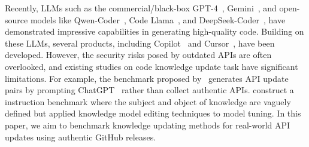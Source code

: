  Recently, LLMs such as the commercial/black-box GPT-4~\cite{openai2024gpt4}, Gemini~\cite{geminiteam2024geminifamilyhighlycapable}, and open-source models like Qwen-Coder~\cite{hui2024qwen2.5coder}, Code Llama~\cite{Roziere2023codellama}, and DeepSeek-Coder~\cite{guo2024deepseek}, have demonstrated impressive capabilities in generating high-quality code. 
Building on these LLMs, several products, including Copilot~\cite{GitHub2022copilot} and Cursor~\cite{cursor}, have been developed. 
However, the security risks posed by outdated APIs are often overlooked, and existing studies on code knowledge update task have significant limitations. 
For example, the benchmark proposed by~\citet{liu2024codeupdatearena} generates API update pairs by prompting ChatGPT~\cite{openai2024gpt4o} rather than collect authentic APIs. 
\citet{li2024modeleditingllms4codefar} construct a instruction benchmark where the subject and object of knowledge are vaguely defined but applied knowledge model editing techniques to model tuning.
In this paper, we aim to benchmark knowledge updating methods for real-world API updates using authentic GitHub releases.


